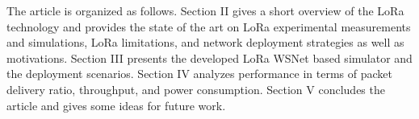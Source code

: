 The article is organized as follows.
Section II gives a short overview of the LoRa technology and provides the state of the art on LoRa experimental measurements and simulations,
	LoRa limitations,
	and network deployment strategies as well as motivations.
Section III presents the developed LoRa WSNet based simulator and the deployment scenarios.
Section IV analyzes performance in terms of packet delivery ratio,
	throughput,
	and power consumption.
Section V concludes the article and gives some ideas for future work.




